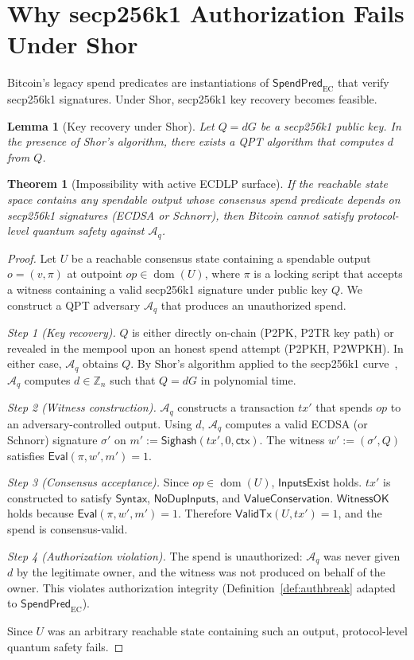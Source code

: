 \documentclass[11pt]{article}
\newtheorem{lemma}{Lemma}
\newtheorem{theorem}{Theorem}
\newcommand{\dom}{\operatorname{dom}}
\newcommand{\Aq}{\mathcal{A}_q}
\newcommand{\Eval}{\mathsf{Eval}}
\newcommand{\Sighash}{\mathsf{Sighash}}
\newcommand{\ValidTx}{\mathsf{ValidTx}}
\newcommand{\SpendPred}{\mathsf{SpendPred}}
\newcommand{\SpendPredEC}{\SpendPred_{\mathrm{EC}}}
\begin{document}
\section{Why secp256k1 Authorization Fails Under Shor}\label{sec:shorbreak}

Bitcoin's legacy spend predicates are instantiations of $\SpendPredEC$ that verify secp256k1 signatures.
Under Shor, secp256k1 key recovery becomes feasible.

\begin{lemma}[Key recovery under Shor]
Let $Q=dG$ be a secp256k1 public key.
In the presence of Shor's algorithm, there exists a QPT algorithm that computes $d$ from $Q$.
\end{lemma}

\begin{theorem}[Impossibility with active ECDLP surface]\label{thm:impossible-ecdlp}
If the reachable state space contains any spendable output whose consensus spend predicate depends on secp256k1 signatures (ECDSA or Schnorr), then Bitcoin cannot satisfy protocol-level quantum safety against $\Aq$.
\end{theorem}

\begin{proof}
Let $U$ be a reachable consensus state containing a spendable output $o=(v,\pi)$ at outpoint $op\in\dom(U)$, where $\pi$ is a locking script that accepts a witness containing a valid secp256k1 signature under public key $Q$.
We construct a QPT adversary $\Aq$ that produces an unauthorized spend.

\emph{Step 1 (Key recovery).}
$Q$ is either directly on-chain (P2PK, P2TR key path) or revealed in the mempool upon an honest spend attempt (P2PKH, P2WPKH).
In either case, $\Aq$ obtains $Q$.
By Shor's algorithm applied to the secp256k1 curve~\cite{shor1994algorithms,proos2003shor}, $\Aq$ computes $d\in\mathbb{Z}_n$ such that $Q=dG$ in polynomial time.

\emph{Step 2 (Witness construction).}
$\Aq$ constructs a transaction $tx'$ that spends $op$ to an adversary-controlled output.
Using $d$, $\Aq$ computes a valid ECDSA (or Schnorr) signature $\sigma'$ on $m':=\Sighash(tx',0,\textsf{ctx})$.
The witness $w':=(\sigma',Q)$ satisfies $\Eval(\pi,w',m')=1$.

\emph{Step 3 (Consensus acceptance).}
Since $op\in\dom(U)$, $\textsf{InputsExist}$ holds.
$tx'$ is constructed to satisfy $\textsf{Syntax}$, $\textsf{NoDupInputs}$, and $\textsf{ValueConservation}$.
$\textsf{WitnessOK}$ holds because $\Eval(\pi,w',m')=1$.
Therefore $\ValidTx(U,tx')=1$, and the spend is consensus-valid.

\emph{Step 4 (Authorization violation).}
The spend is unauthorized: $\Aq$ was never given $d$ by the legitimate owner, and the witness was not produced on behalf of the owner.
This violates authorization integrity (Definition~\ref{def:authbreak} adapted to $\SpendPredEC$).

Since $U$ was an arbitrary reachable state containing such an output, protocol-level quantum safety fails.
\end{proof}
\end{document}
